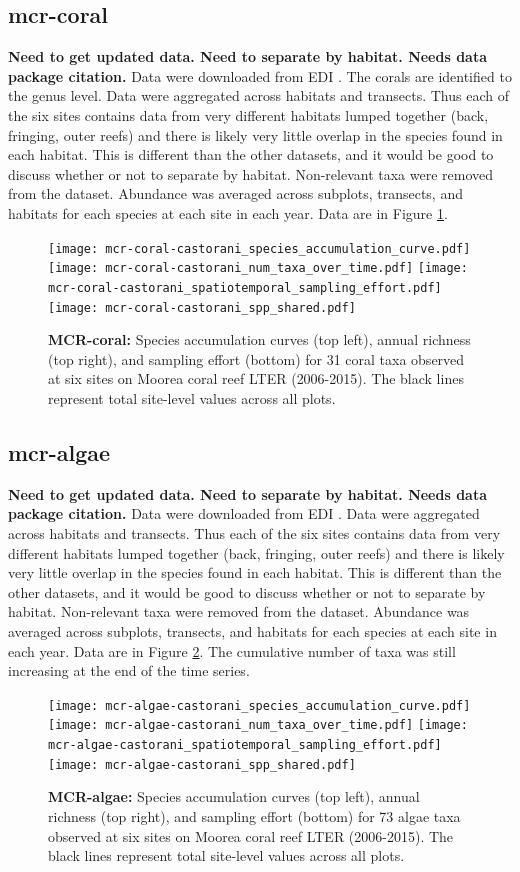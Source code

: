 \documentclass[11pt, oneside]{article}
\begin{document}
\subsection {mcr-coral}
{\bf Need to get updated data. Need to separate by habitat. Needs data package citation.}
Data were downloaded from EDI \citep{mcr-coral}.
The corals are identified to the genus level.
Data were aggregated across habitats and transects.
Thus each of the six sites contains data from very different habitats lumped together (back, fringing, outer reefs) and there is likely very little overlap in the species found in each habitat. 
This is different than the other datasets, and it would be good to discuss whether or not to separate by habitat.
Non-relevant taxa were removed from the dataset.
Abundance was averaged across subplots, transects, and habitats for each species at each site in each year.
Data are in Figure \ref{mcr-coral}.
\begin{figure}[h!]
\centering
\texttt{[image: mcr-coral-castorani\_species\_accumulation\_curve.pdf]}
\texttt{[image: mcr-coral-castorani\_num\_taxa\_over\_time.pdf]}
\texttt{[image: mcr-coral-castorani\_spatiotemporal\_sampling\_effort.pdf]}
\texttt{[image: mcr-coral-castorani\_spp\_shared.pdf]}
\caption{{\bf MCR-coral:} Species accumulation curves (top left),  annual richness (top right), and sampling effort (bottom)  for 31 coral taxa observed at six sites on Moorea coral reef LTER (2006-2015). The black lines represent total site-level values across all plots.}
\label{mcr-coral}
\end{figure}




\subsection {mcr-algae}
{\bf Need to get updated data. Need to separate by habitat. Needs data package citation.}
Data were downloaded from EDI \citep{mcr-algae}.
Data were aggregated across habitats and transects.
Thus each of the six sites contains data from very different habitats lumped together (back, fringing, outer reefs) and there is likely very little overlap in the species found in each habitat. 
This is different than the other datasets, and it would be good to discuss whether or not to separate by habitat.
Non-relevant taxa were removed from the dataset.
Abundance was averaged across subplots, transects, and habitats for each species at each site in each year.
Data are in Figure \ref{mcr-algae}.
The cumulative number of taxa was still increasing at the end of the time series.
\begin{figure}[h!]
\centering
\texttt{[image: mcr-algae-castorani\_species\_accumulation\_curve.pdf]}
\texttt{[image: mcr-algae-castorani\_num\_taxa\_over\_time.pdf]}
\texttt{[image: mcr-algae-castorani\_spatiotemporal\_sampling\_effort.pdf]}
\texttt{[image: mcr-algae-castorani\_spp\_shared.pdf]}
\caption{{\bf MCR-algae:} Species accumulation curves (top left),  annual richness (top right), and sampling effort (bottom)  for 73 algae taxa observed at six sites on Moorea coral reef LTER (2006-2015). The black lines represent total site-level values across all plots.}
\label{mcr-algae}
\end{figure}
\end{document}
